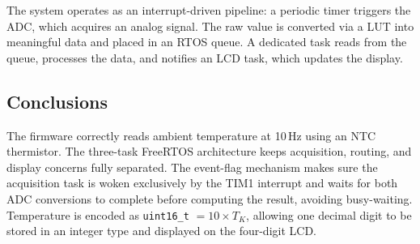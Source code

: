 \documentclass[../main.tex]{subfiles}
\begin{document}
The system operates as an interrupt-driven pipeline: a periodic timer triggers the ADC, which acquires an analog signal. The raw value is converted via a LUT into meaningful data and placed in an RTOS queue. A dedicated task reads from the queue, processes the data, and notifies an LCD task, which updates the display.

\subsection{Conclusions}

The firmware correctly reads ambient temperature at 10\,Hz using an NTC thermistor. The three-task FreeRTOS architecture keeps acquisition, routing, and display concerns fully separated. The event-flag mechanism makes sure the acquisition task is woken exclusively by the TIM1 interrupt and waits for both ADC conversions to complete before computing the result, avoiding  busy-waiting. Temperature is encoded as \texttt{uint16\_t} $= 10\times T_K$, allowing one decimal digit to be stored in an integer type and displayed on the four-digit LCD.
\end{document}
